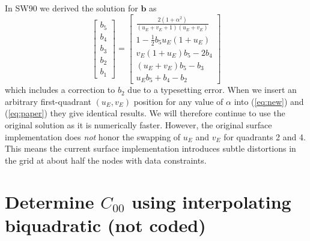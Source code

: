 \documentclass[12pt,letterpaper,margin=0.5in]{article}
\begin{document}
In SW90 we derived the solution for $\mathbf{b}$ as
\begin{equation}
\left[ {\begin{array}{*{20}{c}}
{{b_5}}\\
{{b_4}}\\
{{b_3}}\\
{{b_2}}\\
{{b_1}}
\end{array}} \right] = \left[ {\begin{array}{*{20}{c}}
{\frac{2(1+\alpha^2)}{\left (u_E + v_E + 1 \right)\left (u_E + v_E\right)}}\\[4pt]
{1 - \frac{1}{2}b_5u_E\left(1+u_E\right)}\\[4pt]
{v_E \left(1+u_E\right)b_5 - 2b_4}\\[4pt]
{\left(u_E+v_E\right)b_5 - b_3}\\[4pt]
{u_Eb_5 + b_4 - b_2}
\end{array}} \right]
\label{eq:paper}
\end{equation}
which includes a correction to $b_2$ due to a typesetting error.  When we insert an arbitrary first-quadrant
$(u_E, v_E)$ position for any value of $\alpha$ into (\ref{eq:new}) and (\ref{eq:paper}) they give identical results.
We will therefore continue to use the original solution as it is numerically faster.
However, the original surface implementation does \emph{not} honor the swapping of $u_E$ and $v_E$ for quadrants
2 and 4.  This means the current surface implementation introduces subtle distortions in the grid at about half
the nodes with data constraints.

\section{Determine $C_{00}$ using interpolating biquadratic (not coded)}
\end{document}
